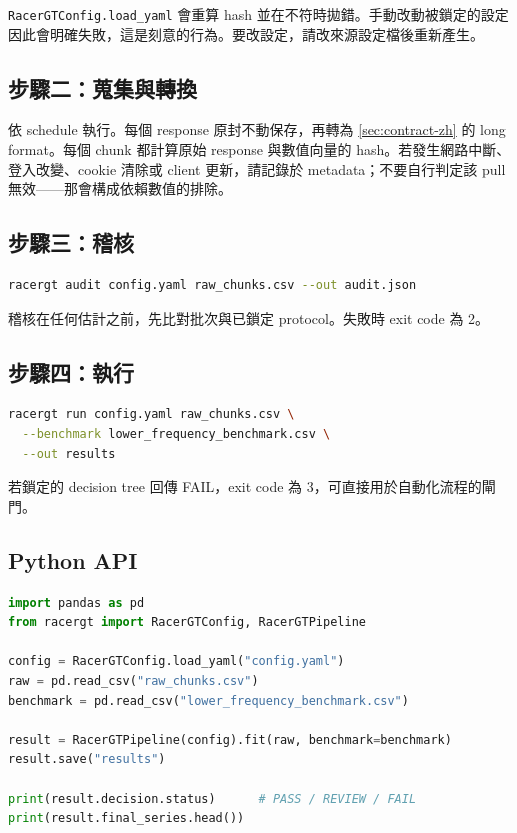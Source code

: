 \documentclass[12pt,a4paper,oneside]{article}
\begin{document}
\begin{remark}
\texttt{RacerGTConfig.load\_yaml} 會重算 hash 並在不符時拋錯。手動改動被鎖定的設定因此會明確失敗，這是刻意的行為。要改設定，請改來源設定檔後重新產生。
\end{remark}

\subsection{步驟二：蒐集與轉換}

依 schedule 執行。每個 response 原封不動保存，再轉為 \cref{sec:contract-zh} 的 long format。每個 chunk 都計算原始 response 與數值向量的 hash。若發生網路中斷、登入改變、cookie 清除或 client 更新，請記錄於 metadata；不要自行判定該 pull 無效——那會構成依賴數值的排除。

\subsection{步驟三：稽核}

\begin{lstlisting}[language=bash]
racergt audit config.yaml raw_chunks.csv --out audit.json
\end{lstlisting}

稽核在任何估計之前，先比對批次與已鎖定 protocol。失敗時 exit code 為 2。

\subsection{步驟四：執行}

\begin{lstlisting}[language=bash]
racergt run config.yaml raw_chunks.csv \
  --benchmark lower_frequency_benchmark.csv \
  --out results
\end{lstlisting}

若鎖定的 decision tree 回傳 FAIL，exit code 為 3，可直接用於自動化流程的閘門。

\subsection{Python API}

\begin{lstlisting}[language=Python]
import pandas as pd
from racergt import RacerGTConfig, RacerGTPipeline

config = RacerGTConfig.load_yaml("config.yaml")
raw = pd.read_csv("raw_chunks.csv")
benchmark = pd.read_csv("lower_frequency_benchmark.csv")

result = RacerGTPipeline(config).fit(raw, benchmark=benchmark)
result.save("results")

print(result.decision.status)      # PASS / REVIEW / FAIL
print(result.final_series.head())
\end{lstlisting}
\end{document}
